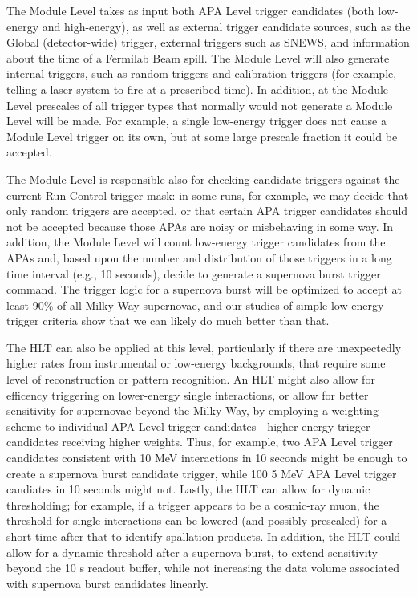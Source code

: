 	The Module Level takes as input both APA Level trigger candidates (both
low-energy and high-energy), as well as external trigger candidate sources,
such as the Global (detector-wide) trigger, external triggers such as SNEWS,
and information about the time of a Fermilab Beam spill.  The Module Level will
also generate internal triggers, such as random triggers and calibration
triggers (for example, telling a laser system to fire at a prescribed time).
In addition, at the Module Level prescales of all trigger types that normally
would not generate a Module Level will be made. For example, a single
low-energy trigger does not cause a Module Level trigger on its own, but at
some large prescale fraction it could be accepted.



	The Module Level is responsible also for checking candidate triggers
against the current Run Control trigger mask: in some runs, for example, we
may decide that only random triggers are accepted, or that certain APA trigger
candidates should not be accepted because those APAs are noisy or misbehaving
in some way.  In addition, the Module Level will count low-energy trigger
candidates from the APAs and, based upon the number and distribution of those
triggers in a long time interval (e.g., 10 seconds), decide to generate a
supernova burst trigger command. The trigger logic for a supernova burst will
be optimized to accept at least 90\% of all Milky Way supernovae, and our
studies of simple low-energy trigger criteria show that we can likely do much
better than that.  

	The HLT can also be applied at this level, particularly if there are
unexpectedly higher rates from instrumental or low-energy backgrounds, that
require some level of reconstruction or pattern recognition.  An HLT might also
allow for efficency triggering on lower-energy single interactions, or allow
for better sensitivity for supernovae beyond the Milky Way, by employing a
weighting scheme to individual APA Level trigger candidates---higher-energy
trigger candidates receiving higher weights. Thus, for example, two APA Level
trigger candidates consistent with 10 MeV interactions in 10 seconds might be
enough to create a supernova burst candidate trigger, while 100 5 MeV APA Level
trigger candiates in 10 seconds might not. Lastly, the HLT can allow for
dynamic thresholding; for example, if a trigger appears to be a cosmic-ray
muon, the threshold for single interactions can be lowered (and possibly
prescaled) for a short time after that to identify spallation products. In
addition, the HLT could allow for a dynamic threshold after a supernova burst,
to extend sensitivity beyond the 10 s readout buffer, while not increasing the
data volume associated with supernova burst candidates linearly. 

